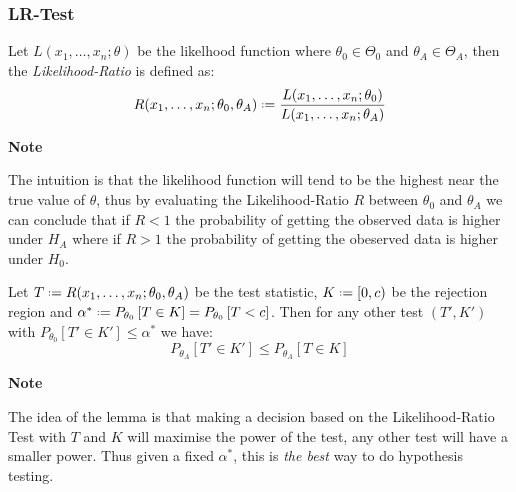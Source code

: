 \documentclass[8pt,a4paper]{extarticle}     %
\newcommand{\colnull}{\vfill\null\columnbreak}
\newcommand{\eqdef}{\mathrel{\vcenter{\baselineskip0.5ex\lineskiplimit0pt\hbox{\scriptsize.}\hbox{\scriptsize.}}}=}
\begin{document}
\begin{multicols}{4}
{\begin{tabularx}{\hsize}{c|c|c|c}
	\hline 
\end{tabularx}} 

\subsubsection*{LR-Test}
\begin{boxdefinition} 
	Let $L(x_1,\dots,x_n;\theta)$ be the likelhood function where $\theta_0\in\Theta_0$ and $\theta_A\in\Theta_A$, then the \textit{Likelihood-Ratio} is defined as:
	\[
		R(x_1,\dots,x_n;\theta_0,\theta_A)\eqdef\frac{L(x_1,\dots,x_n;\theta_0)}{L(x_1,\dots,x_n;\theta_A)}
	\]
\end{boxdefinition}
\begin{listb}
	\item [] \textbf{Note}
	\item The intuition is that the likelihood function will tend to be the highest near the true value of $\theta$, thus by evaluating the Likelihood-Ratio $R$ between $\theta_0$ and $\theta_A$ we can conclude that if $R<1$ the probability of getting the observed data is higher under $H_A$ where if $R>1$ the probability of getting the obeserved data is higher under $H_0$. 
\end{listb}
\begin{boxtheorem} 
	Let $T\eqdef R(x_1,\dots,x_n;\theta_0,\theta_A)$ be the test statistic, $K\eqdef[0,c)$ be the rejection region and $\alpha^*\eqdef P_{\theta_0}\left[T\in K\right] = P_{\theta_0}\left[T<c\right]$. Then for any other test $(T',K')$ with $P_{\theta_0}[T'\in K']\leq \alpha^*$ we have:
	\[
		P_{\theta_A}\left[T'\in K'\right] \leq P_{\theta_A}\left[T\in K\right]
	\]
\end{boxtheorem}
\begin{listb}
	\item [] \textbf{Note}
	\item The idea of the lemma is that making a decision based on the Likelihood-Ratio Test with $T$ and $K$ will maximise the power of the test, any other test will have a smaller power. Thus given a fixed $\alpha^*$, this is \textit{the best} way to do hypothesis testing.
\end{listb}
\colnull


\end{multicols}
\end{document}
